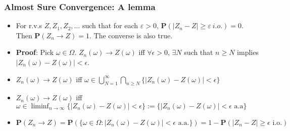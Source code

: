 \documentclass[handout]{beamer}
\newcommand{\BP}{\mathbf{P}}
\begin{document}
\frame
{
  \frametitle{Almost Sure Convergence: A lemma}

   \begin{itemize}
       \item<1->[]
       \begin{Lemma}[5.2.1] 
       For r.v.s $Z, Z_1, Z_2, \ldots $ such that for each $\varepsilon>0$, $\BP(|Z_n-Z| \geq \varepsilon \  i.o.)=0$. Then $\BP(Z_n\rightarrow Z)=1$. The converse is also true.
       \end{Lemma}       
 
    
\item<2-> \textbf{Proof}: Pick $\omega \in \Omega$. $Z_n(\omega) \rightarrow Z(\omega)$ iff $\forall \epsilon > 0$, $\exists N$ such that $n \ge N$ implies $|Z_n(\omega) - Z(\omega)| < \epsilon$.

\item<3-> $Z_n(\omega) \rightarrow Z(\omega)$ iff $\omega \in \bigcup_{N = 1}^{\infty} \bigcap_{n \ge N} \{|Z_n(\omega) - Z(\omega)| < \epsilon\}$

\item<3-> $Z_n(\omega) \rightarrow Z(\omega)$ iff $\omega \in \liminf_{n \to \infty}\{|Z_n(\omega) - Z(\omega)| < \epsilon\} := \{|Z_n(\omega) - Z(\omega)| < \epsilon \text{ a.a}\}$ 

\item<3-> $\BP(Z_n \rightarrow Z) = \BP(\{ \omega \in \Omega :  |Z_n(\omega) - Z(\omega)| < \epsilon \text{ a.a.}\}) = 1 - \BP(|Z_n - Z| \ge \epsilon \text{ i.o.})$
%        
%        
%        
%               
                              
\end{itemize}
}
\end{document}
